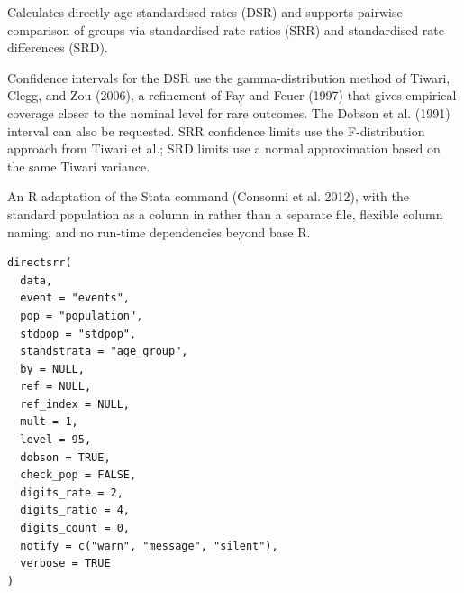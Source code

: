 \documentclass[a4paper]{book}
\begin{document}
%
\begin{Description}
Calculates directly age-standardised rates (DSR) and supports pairwise
comparison of groups via standardised rate ratios (SRR) and standardised
rate differences (SRD).

Confidence intervals for the DSR use the gamma-distribution method of
Tiwari, Clegg, and Zou (2006), a refinement of Fay and Feuer (1997) that
gives empirical coverage closer to the nominal level for rare outcomes.
The Dobson et al. (1991) interval can also be requested. SRR confidence
limits use the F-distribution approach from Tiwari et al.; SRD limits use
a normal approximation based on the same Tiwari variance.

An R adaptation of the Stata command  (Consonni et al.
2012), with the standard population as a column in  rather than
a separate file, flexible column naming, and no run-time dependencies
beyond base R.
\end{Description}
%
\begin{Usage}
\begin{verbatim}
directsrr(
  data,
  event = "events",
  pop = "population",
  stdpop = "stdpop",
  standstrata = "age_group",
  by = NULL,
  ref = NULL,
  ref_index = NULL,
  mult = 1,
  level = 95,
  dobson = TRUE,
  check_pop = FALSE,
  digits_rate = 2,
  digits_ratio = 4,
  digits_count = 0,
  notify = c("warn", "message", "silent"),
  verbose = TRUE
)
\end{verbatim}
\end{Usage}
%
\end{document}

